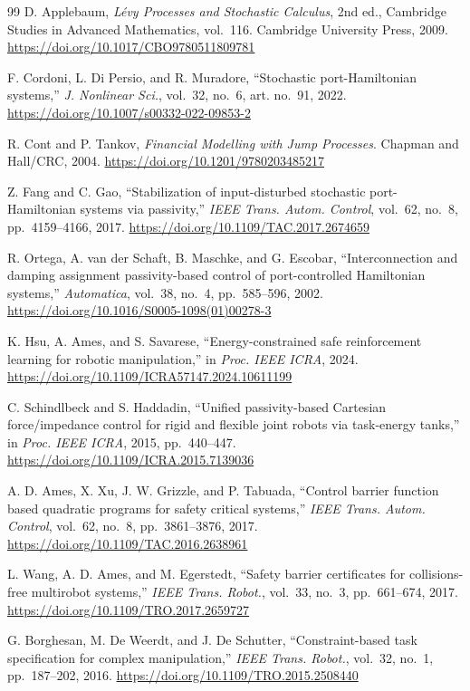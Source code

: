 \documentclass[11pt]{article}
\begin{document}
\begin{thebibliography}{99}
D. Applebaum,
\emph{L\'{e}vy Processes and Stochastic Calculus}, 2nd ed.,
Cambridge Studies in Advanced Mathematics, vol.~116.
Cambridge University Press, 2009.
\url{https://doi.org/10.1017/CBO9780511809781}

F. Cordoni, L. Di Persio, and R. Muradore,
``Stochastic port-Hamiltonian systems,''
\emph{J. Nonlinear Sci.}, vol.~32, no.~6, art. no.~91, 2022.
\url{https://doi.org/10.1007/s00332-022-09853-2}

R. Cont and P. Tankov,
\emph{Financial Modelling with Jump Processes}.
Chapman and Hall/CRC, 2004.
\url{https://doi.org/10.1201/9780203485217}

Z. Fang and C. Gao,
``Stabilization of input-disturbed stochastic port-Hamiltonian systems via
passivity,''
\emph{IEEE Trans. Autom. Control}, vol.~62, no.~8, pp.~4159--4166, 2017.
\url{https://doi.org/10.1109/TAC.2017.2674659}

R. Ortega, A. van der Schaft, B. Maschke, and G. Escobar,
``Interconnection and damping assignment passivity-based control of
port-controlled Hamiltonian systems,''
\emph{Automatica}, vol.~38, no.~4, pp.~585--596, 2002.
\url{https://doi.org/10.1016/S0005-1098(01)00278-3}

K. Hsu, A. Ames, and S. Savarese,
``Energy-constrained safe reinforcement learning for robotic manipulation,''
in \emph{Proc. IEEE ICRA}, 2024.
\url{https://doi.org/10.1109/ICRA57147.2024.10611199}

C. Schindlbeck and S. Haddadin,
``Unified passivity-based Cartesian force/impedance control for rigid and
flexible joint robots via task-energy tanks,''
in \emph{Proc. IEEE ICRA}, 2015, pp.~440--447.
\url{https://doi.org/10.1109/ICRA.2015.7139036}

A. D. Ames, X. Xu, J. W. Grizzle, and P. Tabuada,
``Control barrier function based quadratic programs for safety critical
systems,''
\emph{IEEE Trans. Autom. Control}, vol.~62, no.~8, pp.~3861--3876, 2017.
\url{https://doi.org/10.1109/TAC.2016.2638961}

L. Wang, A. D. Ames, and M. Egerstedt,
``Safety barrier certificates for collisions-free multirobot systems,''
\emph{IEEE Trans. Robot.}, vol.~33, no.~3, pp.~661--674, 2017.
\url{https://doi.org/10.1109/TRO.2017.2659727}

G. Borghesan, M. De Weerdt, and J. De Schutter,
``Constraint-based task specification for complex manipulation,''
\emph{IEEE Trans. Robot.}, vol.~32, no.~1, pp.~187--202, 2016.
\url{https://doi.org/10.1109/TRO.2015.2508440}


\end{thebibliography}
\end{document}

